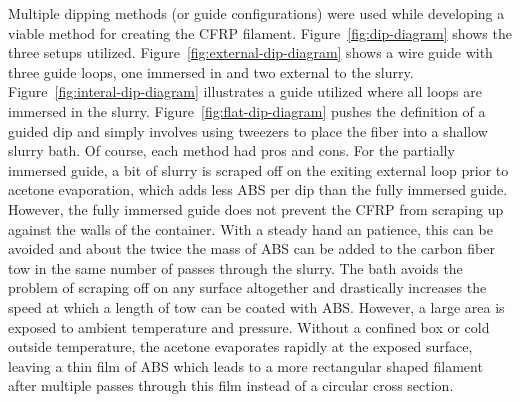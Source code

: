 Multiple dipping methods (or guide configurations) were used while developing a viable method for creating the CFRP filament. Figure~\ref{fig:dip-diagram} shows the three setups utilized. Figure~\ref{fig:external-dip-diagram} shows a wire guide with three guide loops, one immersed in and two external to the slurry. Figure~\ref{fig:interal-dip-diagram} illustrates a guide utilized where all loops are immersed in the slurry. Figure~\ref{fig:flat-dip-diagram} pushes the definition of a guided dip and simply involves using tweezers to place the fiber into a shallow slurry bath. Of course, each method had pros and cons. For the partially immersed guide, a bit of slurry is scraped off on the exiting external loop prior to acetone evaporation, which adds less ABS per dip than the fully immersed guide. However, the fully immersed guide does not prevent the CFRP from scraping up against the walls of the container. With a steady hand an patience, this can be avoided and about the twice the mass of ABS can be added to the carbon fiber tow in the same number of passes through the slurry. The bath avoids the problem of scraping off on any surface altogether and drastically increases the speed at which a length of tow can be coated with ABS. However, a large area is exposed to ambient temperature and pressure. Without a confined box or cold outside temperature, the acetone evaporates rapidly at the exposed surface, leaving a thin film of ABS which leads to a more rectangular shaped filament after multiple passes through this film instead of a circular cross section. \\

